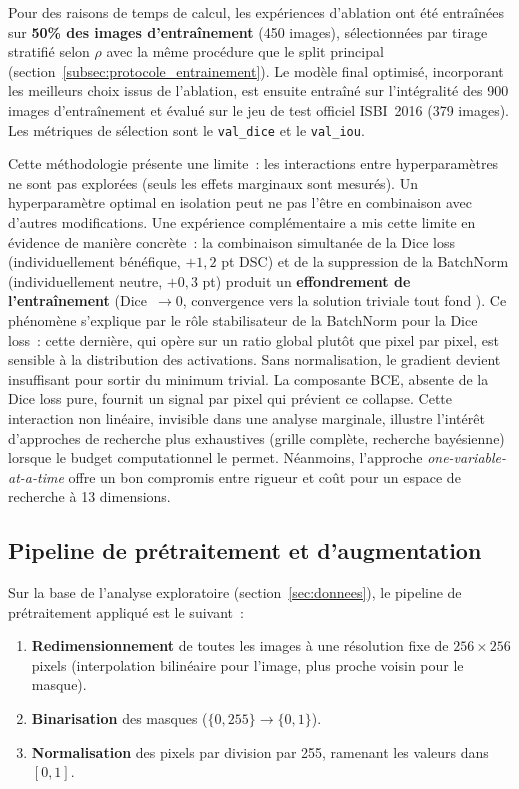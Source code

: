 \documentclass[12pt,a4paper]{article}
\begin{document}
Pour des raisons de temps de calcul, les expériences d'ablation ont été entraînées sur \textbf{50\% des images d'entraînement} (450 images), sélectionnées par tirage stratifié selon $\rho$ avec la même procédure que le split principal (section~\ref{subsec:protocole_entrainement}). Le modèle final optimisé, incorporant les meilleurs choix issus de l'ablation, est ensuite entraîné sur l'intégralité des 900 images d'entraînement et évalué sur le jeu de test officiel ISBI~2016 (379 images). Les métriques de sélection sont le \texttt{val\_dice} et le \texttt{val\_iou}.

Cette méthodologie présente une limite~: les interactions entre hyperparamètres ne sont pas explorées (seuls les effets marginaux sont mesurés). Un hyperparamètre optimal en isolation peut ne pas l'être en combinaison avec d'autres modifications. Une expérience complémentaire a mis cette limite en évidence de manière concrète~: la combinaison simultanée de la Dice loss (individuellement bénéfique, $+1{,}2$ pt DSC) et de la suppression de la BatchNorm (individuellement neutre, $+0{,}3$ pt) produit un \textbf{effondrement de l'entraînement} (Dice~$\to 0$, convergence vers la solution triviale \og tout fond \fg{}). Ce phénomène s'explique par le rôle stabilisateur de la BatchNorm pour la Dice loss~: cette dernière, qui opère sur un ratio global plutôt que pixel par pixel, est sensible à la distribution des activations. Sans normalisation, le gradient devient insuffisant pour sortir du minimum trivial. La composante BCE, absente de la Dice loss pure, fournit un signal par pixel qui prévient ce collapse. Cette interaction non linéaire, invisible dans une analyse marginale, illustre l'intérêt d'approches de recherche plus exhaustives (grille complète, recherche bayésienne) lorsque le budget computationnel le permet. Néanmoins, l'approche \emph{one-variable-at-a-time} offre un bon compromis entre rigueur et coût pour un espace de recherche à 13 dimensions.

\subsection{Pipeline de prétraitement et d'augmentation}
\label{subsec:pipeline}

Sur la base de l'analyse exploratoire (section~\ref{sec:donnees}), le pipeline de prétraitement appliqué est le suivant~:
\begin{enumerate}[nosep]
    \item \textbf{Redimensionnement} de toutes les images à une résolution fixe de $256 \times 256$ pixels (interpolation bilinéaire pour l'image, plus proche voisin pour le masque).
    \item \textbf{Binarisation} des masques ($\{0, 255\} \to \{0, 1\}$).
    \item \textbf{Normalisation} des pixels par division par 255, ramenant les valeurs dans $[0, 1]$.
\end{enumerate}
\end{document}
